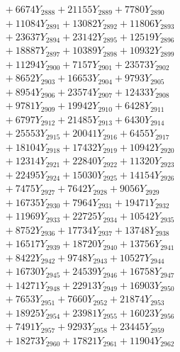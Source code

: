 \documentclass[a4paper,10pt]{article}
\begin{document}
{\begin{align}
&\;  + 6674 Y_{2888} + 21155 Y_{2889} + 7780 Y_{2890} \\[0.3ex]
&\;  + 11084 Y_{2891} + 13082 Y_{2892} + 11806 Y_{2893} \\[0.3ex]
&\;  + 23637 Y_{2894} + 23142 Y_{2895} + 12519 Y_{2896} \\[0.3ex]
&\;  + 18887 Y_{2897} + 10389 Y_{2898} + 10932 Y_{2899} \\[0.3ex]
&\;  + 11294 Y_{2900} + 7157 Y_{2901} + 23573 Y_{2902} \\[0.3ex]
&\;  + 8652 Y_{2903} + 16653 Y_{2904} + 9793 Y_{2905} \\[0.3ex]
&\;  + 8954 Y_{2906} + 23574 Y_{2907} + 12433 Y_{2908} \\[0.5ex]\allowbreak
&\;  + 9781 Y_{2909} + 19942 Y_{2910} + 6428 Y_{2911} \\[0.3ex]
&\;  + 6797 Y_{2912} + 21485 Y_{2913} + 6430 Y_{2914} \\[0.3ex]
&\;  + 25553 Y_{2915} + 20041 Y_{2916} + 6455 Y_{2917} \\[0.3ex]
&\;  + 18104 Y_{2918} + 17432 Y_{2919} + 10942 Y_{2920} \\[0.3ex]
&\;  + 12314 Y_{2921} + 22840 Y_{2922} + 11320 Y_{2923} \\[0.3ex]
&\;  + 22495 Y_{2924} + 15030 Y_{2925} + 14154 Y_{2926} \\[0.3ex]
&\;  + 7475 Y_{2927} + 7642 Y_{2928} + 9056 Y_{2929} \\[0.3ex]
&\;  + 16735 Y_{2930} + 7964 Y_{2931} + 19471 Y_{2932} \\[0.3ex]
&\;  + 11969 Y_{2933} + 22725 Y_{2934} + 10542 Y_{2935} \\[0.3ex]
&\;  + 8752 Y_{2936} + 17734 Y_{2937} + 13748 Y_{2938} \\[0.5ex]\allowbreak
&\;  + 16517 Y_{2939} + 18720 Y_{2940} + 13756 Y_{2941} \\[0.3ex]
&\;  + 8422 Y_{2942} + 9748 Y_{2943} + 10527 Y_{2944} \\[0.3ex]
&\;  + 16730 Y_{2945} + 24539 Y_{2946} + 16758 Y_{2947} \\[0.3ex]
&\;  + 14271 Y_{2948} + 22913 Y_{2949} + 16903 Y_{2950} \\[0.3ex]
&\;  + 7653 Y_{2951} + 7660 Y_{2952} + 21874 Y_{2953} \\[0.3ex]
&\;  + 18925 Y_{2954} + 23981 Y_{2955} + 16023 Y_{2956} \\[0.3ex]
&\;  + 7491 Y_{2957} + 9293 Y_{2958} + 23445 Y_{2959} \\[0.3ex]
&\;  + 18273 Y_{2960} + 17821 Y_{2961} + 11904 Y_{2962} \\[0.3ex]

\end{align}}
\end{document}
